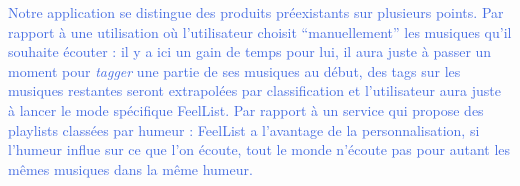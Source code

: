 \textcolor{RoyalBlue}{
Notre application se distingue des produits préexistants sur plusieurs points.
Par rapport à une utilisation où l'utilisateur choisit “manuellement” les musiques qu'il souhaite écouter : il y a ici un gain de temps pour lui, il aura juste à passer un moment pour \textit{tagger} une partie de ses musiques au début, des tags sur les musiques restantes seront extrapolées par classification et l'utilisateur aura juste à lancer le mode spécifique FeelList.
Par rapport à un service qui propose des playlists classées par humeur : FeelList a l'avantage de la personnalisation, si l'humeur influe sur ce que l'on écoute, tout le monde n'écoute pas pour autant les mêmes musiques dans la même humeur.
}